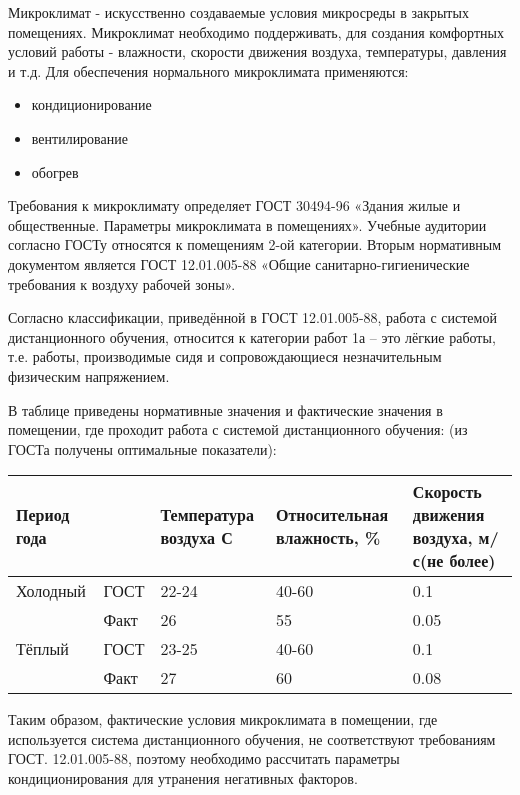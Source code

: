 Микроклимат - искусственно создаваемые условия микросреды в закрытых помещениях.
Микроклимат необходимо поддерживать, для создания комфортных условий работы - влажности, скорости движения воздуха, температуры, давления и т.д.
Для обеспечения нормального микроклимата применяются:

\begin{itemize}
\item кондиционирование
\item вентилирование
\item обогрев
\end{itemize}

Требования к микроклимату определяет ГОСТ 30494-96 «Здания жилые и общест\-венные. Параметры микроклимата в помещениях». Учебные аудитории согласно ГОСТу относятся к помещениям 2-ой категории. Вторым нормативным документом является ГОСТ 12.01.005-88 «Общие санитарно-гигиенические требования к воздуху рабочей зоны».

Согласно классификации, приведённой в ГОСТ 12.01.005-88, работа с системой дистан\-ционного обучения, относится к категории работ 1а – это лёгкие работы, т.е. работы, производимые сидя и сопровождающиеся незначительным физическим напряжением.

В таблице приведены нормативные значения и фактические значения в помещении, где проходит работа с системой дистанционного обучения: (из ГОСТа получены оптимальные показатели):

\begin{table}[H]
\begin{center}
\begin{tabular}{|l|p{}|p{2.5cm}|p{3cm}|p{3cm}|}
\hline
Период года &  & Температура воздуха С & Относительная влажность, \% & Скорость движения воздуха, м/с(не более)\\
\hline
Холодный & ГОСТ & 22-24 & 40-60 & 0.1\\
 & Факт & 26 & 55 & 0.05\\
\hline
Тёплый & ГОСТ & 23-25 & 40-60 & 0.1\\
 & Факт & 27 & 60 & 0.08\\
\hline
\end{tabular}
\end{center}
\end{table}

Таким образом, фактические условия микроклимата в помещении, где используется система дистанционного обучения, не соответствуют требованиям ГОСТ. 12.01.005-88, поэтому необходимо рассчитать параметры кондиционирования для утранения негативных факторов.

